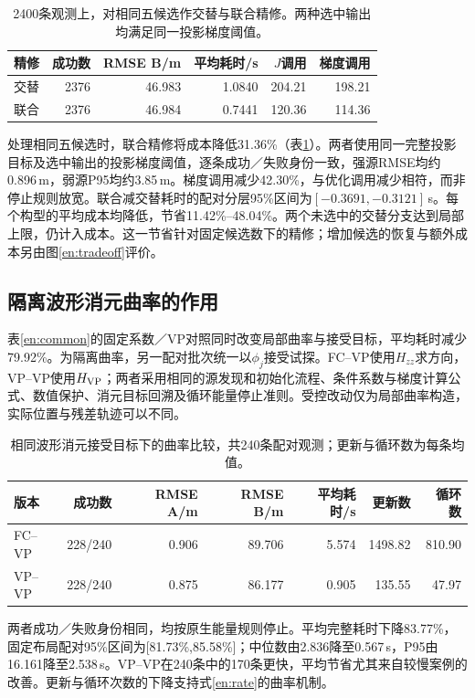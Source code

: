 \documentclass[a4paper,fleqn]{cas-sc}
\begin{document}
\begin{table}[pos=H]\centering\small
\caption{2400条观测上，对相同五候选作交替与联合精修。两种选中输出均满足同一投影梯度阈值。}\label{en:apjoint}
\begin{tabular}{@{}lrrrrr@{}}\toprule
精修 & 成功数 & RMSE B/m & 平均耗时/s & $J$调用 & 梯度调用\\\midrule
交替 & 2376 & 46.983 & 1.0840 & 204.21 & 198.21\\
联合 & 2376 & 46.984 & 0.7441 & 120.36 & 114.36\\\bottomrule
\end{tabular}\end{table}
处理相同五候选时，联合精修将成本降低31.36\%（表\ref{en:apjoint}）。两者使用同一完整投影目标及选中输出的投影梯度阈值，逐条成功／失败身份一致，强源RMSE均约0.896\,m，弱源P95均约3.85\,m。梯度调用减少42.30\%，与优化调用减少相符，而非停止规则放宽。联合减交替耗时的配对分层95\%区间为$[-0.3691,-0.3121]$\,s。每个构型的平均成本均降低，节省11.42\%--48.04\%。两个未选中的交替分支达到局部上限，仍计入成本。这一节省针对固定候选数下的精修；增加候选的恢复与额外成本另由图\ref{en:tradeoff}评价。

\FloatBarrier
\subsection{隔离波形消元曲率的作用}
表\ref{en:common}的固定系数／VP对照同时改变局部曲率与接受目标，平均耗时减少79.92\%。为隔离曲率，另一配对批次统一以$\phi_j$接受试探。FC--VP使用$H_{zz}$求方向，VP--VP使用$H_{\rm VP}$；两者采用相同的源发现和初始化流程、条件系数与梯度计算公式、数值保护、消元目标回溯及循环能量停止准则。受控改动仅为局部曲率构造，实际位置与残差轨迹可以不同。
\begin{table}[pos=H]\centering\small
\caption{相同波形消元接受目标下的曲率比较，共240条配对观测；更新与循环数为每条均值。}\label{en:curvaturetable}
\begin{tabular}{@{}lrrrrrr@{}}\toprule
版本 & 成功数 & RMSE A/m & RMSE B/m & 平均耗时/s & 更新数 & 循环数\\\midrule
FC--VP & 228/240 & 0.906 & 89.706 & 5.574 & 1498.82 & 810.90\\
VP--VP & 228/240 & 0.875 & 86.177 & 0.905 & 135.55 & 47.97\\\bottomrule
\end{tabular}\end{table}
两者成功／失败身份相同，均按原生能量规则停止。平均完整耗时下降83.77\%，固定布局配对95\%区间为[81.73\%,85.58\%]；中位数由2.836降至0.567\,s，P95由16.161降至2.538\,s。VP--VP在240条中的170条更快，平均节省尤其来自较慢案例的改善。更新与循环次数的下降支持式\eqref{en:rate}的曲率机制。
\end{document}
